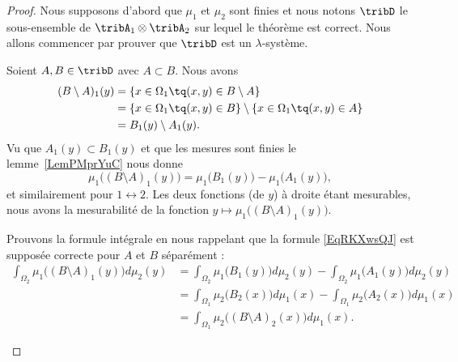 \begin{proof}
	Nous supposons d'abord que \( \mu_1\) et \( \mu_2\) sont finies et nous notons \( \tribD\) le sous-ensemble de \( \tribA_1\otimes \tribA_2\) sur lequel le théorème est correct. Nous allons commencer par prouver que \( \tribD\) est un \( \lambda\)-système.

	\begin{subproof}
		Soient \( A,B\in\tribD\) avec \( A\subset B\). Nous avons
		\begin{subequations}
			\begin{align}
				(B\setminus A)_1(y) & =\{ x\in \Omega_1\tq(x,y)\in B\setminus A \}                               \\
				                    & =\{ x\in \Omega_1\tq(x,y)\in B\}\setminus\{ x\in \Omega_1\tq(x,y)\in  A \} \\
				                    & =B_1(y)\setminus A_1(y).
			\end{align}
		\end{subequations}
		Vu que \( A_1(y)\subset B_1(y)\) et que les mesures sont finies le lemme~\ref{LemPMprYuC} nous donne
		\begin{equation}
			\mu_1\big( (B\setminus A)_1(y) \big)=\mu_1\big( B_1(y) \big)-\mu_1\big( A_1(y) \big),
		\end{equation}
		et similairement pour \( 1\leftrightarrow 2\). Les deux fonctions (de \( y\)) à droite étant mesurables, nous avons la mesurabilité de la fonction \( y\mapsto \mu_1\big( (B\setminus A)_1(y) \big)\).

		Prouvons la formule intégrale en nous rappelant que la formule \eqref{EqRKXwsQJ} est supposée correcte pour \( A\) et \( B\) séparément :
		\begin{subequations}
			\begin{align}
				\int_{\Omega_2}\mu_1\big( (B\setminus A)_1(y) \big)d\mu_2(y) & =\int_{\Omega_2}\mu_1\big( B_1(y) \big)d\mu_2(y)-\int_{\Omega_2}\mu_1\big( A_1(y) \big)d\mu_2(y) \\
				                                                             & =\int_{\Omega_1}\mu_2\big( B_2(x) \big)d\mu_1(x)-\int_{\Omega_1}\mu_2\big( A_2(x) \big)d\mu_1(x) \\
				                                                             & =\int_{\Omega_1}\mu_2\big( (B\setminus A)_2(x) \big)d\mu_1(x).
			\end{align}
		\end{subequations}



\end{subproof}
\end{proof}
